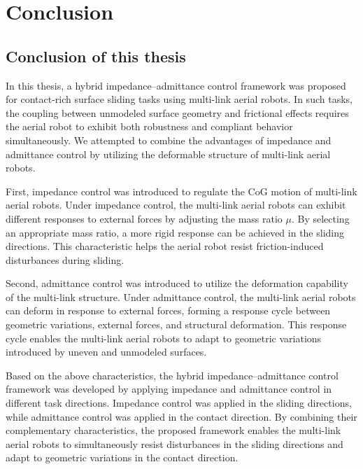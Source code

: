 \chapter{Conclusion}
\section{Conclusion of this thesis}
In this thesis, a hybrid impedance--admittance control framework was proposed for contact-rich surface sliding tasks using multi-link aerial robots. In such tasks, the coupling between unmodeled surface geometry and frictional effects requires the aerial robot to exhibit both robustness and compliant behavior simultaneously. We attempted to combine the advantages of impedance and admittance control by utilizing the deformable structure of multi-link aerial robots.

First, impedance control was introduced to regulate the CoG motion of multi-link aerial robots. Under impedance control, the multi-link aerial robots can exhibit different responses to external forces by adjusting the mass ratio $\mu$. By selecting an appropriate mass ratio, a more rigid response can be achieved in the sliding directions. This characteristic helps the aerial robot resist friction-induced disturbances during sliding.

Second, admittance control was introduced to utilize the deformation capability of the multi-link structure. Under admittance control, the multi-link aerial robots can deform in response to external forces, forming a response cycle between geometric variations, external forces, and structural deformation. This response cycle enables the multi-link aerial robots to adapt to geometric variations introduced by uneven and unmodeled surfaces.

Based on the above characteristics, the hybrid impedance--admittance control framework was developed by applying impedance and admittance control in different task directions. Impedance control was applied in the sliding directions, while admittance control was applied in the contact direction. By combining their complementary characteristics, the proposed framework enables the multi-link aerial robots to simultaneously resist disturbances in the sliding directions and adapt to geometric variations in the contact direction.


